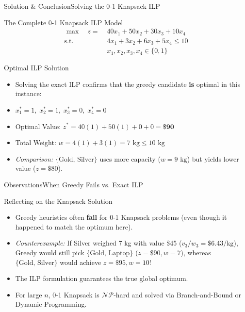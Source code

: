 \documentclass[aspectratio=169]{beamer}
\begin{document}
\begin{frame}{Solution \& Conclusion}{Solving the 0-1 Knapsack ILP}
    \footnotesize
    \begin{block}{The Complete 0-1 Knapsack ILP Model}
        \vspace{-0.6em}
        \begin{align*}
            \max \quad z = & \; 40x_1 + 50x_2 + 30x_3 + 10x_4 \\
            \text{s.t.} \quad & \; 4x_1 + 3x_2 + 6x_3 + 5x_4 \le 10 \\
            & \; x_1, x_2, x_3, x_4 \in \{0, 1\}
        \end{align*}
    \end{block}
    \begin{alertblock}{Optimal ILP Solution}
        \begin{itemize}
            \item Solving the exact ILP confirms that the greedy candidate \textbf{is} optimal in this instance:
            \item $x_1^*=1, \; x_2^*=1, \; x_3^*=0, \; x_4^*=0$
            \item Optimal Value: $z^* = 40(1) + 50(1) + 0 + 0 = \mathbf{\$90}$
            \item Total Weight: $w = 4(1) + 3(1) = 7\text{ kg} \le 10\text{ kg}$
            \item \textit{Comparison:} $\{\text{Gold, Silver}\}$ uses more capacity ($w=9\text{ kg}$) but yields lower value ($z=\$80$).
        \end{itemize}
    \end{alertblock}
\end{frame}

\begin{frame}{Observations}{When Greedy Fails vs. Exact ILP}
    \begin{block}{Reflecting on the Knapsack Solution}
        \begin{itemize}
            \item Greedy heuristics often \textbf{fail} for 0-1 Knapsack problems (even though it happened to match the optimum here).
            \item \textit{Counterexample:} If Silver weighed 7 kg with value \$45 ($v_3/w_3 = \$6.43/\text{kg}$), Greedy would still pick $\{\text{Gold, Laptop}\}$ ($z=\$90, w=7$), whereas $\{\text{Gold, Silver}\}$ would achieve $z=\$95, w=10$!
            \item The ILP formulation guarantees the true global optimum.
            \item For large $n$, 0-1 Knapsack is $\mathcal{NP}$-hard and solved via Branch-and-Bound or Dynamic Programming.
        \end{itemize}
    \end{block}
\end{frame}
\end{document}
